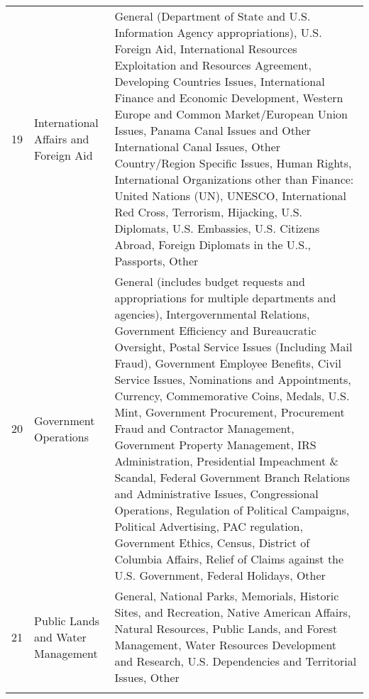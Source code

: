 {\begin{longtable}{p{}p{}p{}}
  19 & International Affairs and Foreign Aid & General (Department of State and U.S. Information Agency appropriations), U.S. Foreign Aid, International Resources Exploitation and Resources Agreement, Developing Countries Issues, International Finance and Economic Development, Western Europe and Common Market/European Union Issues, Panama Canal Issues and Other International Canal Issues, Other Country/Region Specific Issues, Human Rights, International Organizations other than Finance: United Nations (UN), UNESCO, International Red Cross, Terrorism, Hijacking, U.S. Diplomats, U.S. Embassies, U.S. Citizens Abroad, Foreign Diplomats in the U.S., Passports, Other \\ 
  20 & Government Operations & General (includes budget requests and appropriations for multiple departments and agencies), Intergovernmental Relations, Government Efficiency and Bureaucratic Oversight, Postal Service Issues (Including Mail Fraud), Government Employee Benefits, Civil Service Issues, Nominations and Appointments, Currency, Commemorative Coins, Medals, U.S. Mint, Government Procurement, Procurement Fraud and Contractor Management, Government Property Management, IRS Administration, Presidential Impeachment \& Scandal, Federal Government Branch Relations and Administrative Issues, Congressional Operations, Regulation of Political Campaigns, Political Advertising, PAC regulation, Government Ethics, Census, District of Columbia Affairs, Relief of Claims against the U.S. Government, Federal Holidays, Other \\ 
  21 & Public Lands and Water Management & General, National Parks, Memorials, Historic Sites, and Recreation, Native American Affairs, Natural Resources, Public Lands, and Forest Management, Water Resources Development and Research, U.S. Dependencies and Territorial Issues, Other \\ 
   \hline
\hline
\label{paptable}
\end{longtable}
}
